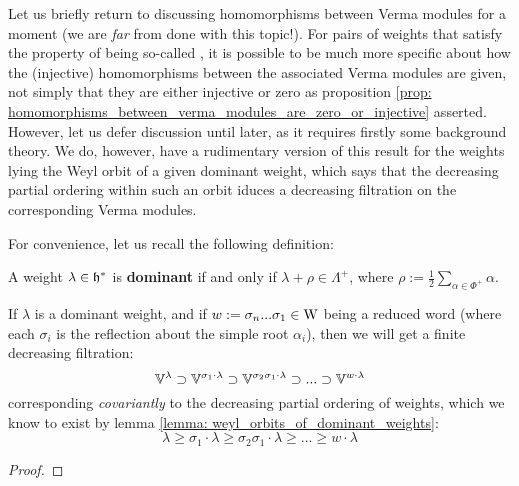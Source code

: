         Let us briefly return to discussing homomorphisms between Verma modules for a moment (we are \textit{far} from done with this topic!). For pairs of weights that satisfy the property of being so-called , it is possible to be much more specific about how the (injective) homomorphisms between the associated Verma modules are given, not simply that they are either injective or zero as proposition \ref{prop: homomorphisms_between_verma_modules_are_zero_or_injective} asserted. However, let us defer discussion until later, as it requires firstly some background theory. We do, however, have a rudimentary version of this result for the weights lying the Weyl orbit of a given dominant weight, which says that the decreasing partial ordering within such an orbit iduces a decreasing filtration on the corresponding Verma modules.
        
        For convenience, let us recall the following definition:
        \begin{definition} \label{def: dominant_weights}
            A weight $\lambda \in \mathfrak{h}^*$ is \textbf{dominant} if and only if $\lambda + \rho \in \Lambda^+$, where $\rho := \frac12 \sum_{\alpha \in \Phi^+} \alpha$.
        \end{definition}
        \begin{remark}
            
        \end{remark}
        \begin{lemma} \label{lemma: weyl_orbits_of_dominant_weights}
            \cite[Lemma 13.2A]{humphreys_lie_algebras}
        \end{lemma}
        \begin{theorem} \label{theorem: weyl_filtrations_for_dominant_verma_modules}
            If $\lambda$ is a dominant weight, and if $w := \sigma_n ... \sigma_1 \in \mathrm{W}$ being a reduced word (where each $\sigma_i$ is the reflection about the simple root $\alpha_i$), then we will get a finite decreasing filtration:
                $$\mathbb{V}^{\lambda} \supset \mathbb{V}^{\sigma_1 \cdot \lambda} \supset \mathbb{V}^{\sigma_2 \sigma_1 \cdot \lambda} \supset ... \supset \mathbb{V}^{w \cdot \lambda}$$
            corresponding \textit{covariantly} to the decreasing partial ordering of weights, which we know to exist by lemma \ref{lemma: weyl_orbits_of_dominant_weights}:
                $$\lambda \geq \sigma_1 \cdot \lambda \geq \sigma_2 \sigma_1 \cdot \lambda \geq ... \geq w \cdot \lambda$$
        \end{theorem}
            \begin{proof}
                
            \end{proof} 

